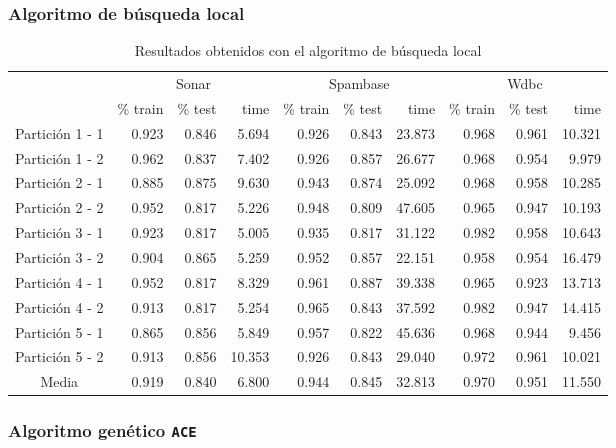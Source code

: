 \documentclass[11pt]{article}
\theoremstyle{plain}
\theoremstyle{definition}
\begin{document}
\subsubsection{Algoritmo de búsqueda local}

\begin{table}[H]
\centering
\caption{Resultados obtenidos con el algoritmo de búsqueda local}
\label{tbl-ls}
\begin{tabular}{@{}crrrrrrrrr@{}}
  \toprule
  & \multicolumn{3}{c}{Sonar} & \multicolumn{3}{c}{Spambase} & \multicolumn{3}{c}{Wdbc}  \\
  \cmidrule(r){2-10}
           & \% train & \% test & time & \% train   & \% test   & time & \% train & \% test & time \\
  \midrule
Partición 1 - 1      & 0.923 & 0.846 & 5.694  & 0.926 & 0.843 & 23.873  & 0.968 & 0.961 & 10.321  \\
Partición 1 - 2      & 0.962 & 0.837 & 7.402  & 0.926 & 0.857 & 26.677  & 0.968 & 0.954 & 9.979   \\
Partición 2 - 1      & 0.885 & 0.875 & 9.630  & 0.943 & 0.874 & 25.092  & 0.968 & 0.958 & 10.285  \\
Partición 2 - 2      & 0.952 & 0.817 & 5.226  & 0.948 & 0.809 & 47.605  & 0.965 & 0.947 & 10.193  \\
Partición 3 - 1      & 0.923 & 0.817 & 5.005  & 0.935 & 0.817 & 31.122  & 0.982 & 0.958 & 10.643  \\
Partición 3 - 2      & 0.904 & 0.865 & 5.259  & 0.952 & 0.857 & 22.151  & 0.958 & 0.954 & 16.479  \\
Partición 4 - 1      & 0.952 & 0.817 & 8.329  & 0.961 & 0.887 & 39.338  & 0.965 & 0.923 & 13.713  \\
Partición 4 - 2      & 0.913 & 0.817 & 5.254  & 0.965 & 0.843 & 37.592  & 0.982 & 0.947 & 14.415  \\
Partición 5 - 1      & 0.865 & 0.856 & 5.849  & 0.957 & 0.822 & 45.636  & 0.968 & 0.944 & 9.456   \\
Partición 5 - 2      & 0.913 & 0.856 & 10.353 & 0.926 & 0.843 & 29.040  & 0.972 & 0.961 & 10.021  \\
  \bottomrule
Media                & 0.919 & 0.840 & 6.800  & 0.944 & 0.845 & 32.813  & 0.970 & 0.951 & 11.550  \\
\end{tabular}
\end{table}


\subsubsection{Algoritmo genético \texttt{ACE}}
\end{document}
